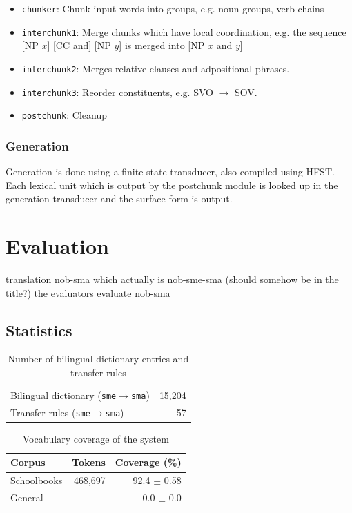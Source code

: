 \documentclass[a4paper,11pt,twocolumn]{article}
\begin{document}
\begin{itemize} 
  \item \texttt{chunker}: Chunk input words into groups, e.g. noun groups, verb chains
  \item \texttt{interchunk1}: Merge chunks which have local coordination, e.g. the sequence [NP $x$] [CC and] [NP $y$] is merged into [NP $x$ and $y$]
  \item \texttt{interchunk2}: Merges relative clauses and adpositional phrases.
  \item \texttt{interchunk3}: Reorder constituents, e.g. SVO $\rightarrow$ SOV.
  \item \texttt{postchunk}: Cleanup
\end{itemize}

\subsubsection{Generation}

Generation is done using a finite-state transducer, also 
compiled using HFST. Each lexical unit which is output by
the postchunk module is looked up in the generation transducer
and the surface form is output.

\section{Evaluation}
 translation nob-sma which actually is nob-sme-sma (should somehow be in the title?) 
 the evaluators evaluate nob-sma

\subsection{Statistics}
\begin{table}
  \begin{center}
    \begin{tabular}{|l|r|}
      \hline
      Bilingual dictionary ({\tt sme}$\rightarrow${\tt sma}) & 15,204 \\ %
      Transfer rules ({\tt sme}$\rightarrow${\tt sma}) & 57 \\
      \hline
    \end{tabular}
    \label{table:transfer}
    \caption{Number of bilingual dictionary entries and transfer rules}
  \end{center}
\end{table}

\begin{table}
  \begin{center}
    \begin{tabular}{|l|r|r|}
      \hline
      \textbf{Corpus} & \textbf{Tokens} & \textbf{Coverage (\%)}  \\
      \hline
      Schoolbooks     & 468,697 & 92.4 $\pm$ 0.58 \\
      General         & & 0.0 $\pm$ 0.0 \\
      \hline
    \end{tabular}
    \label{table:coverage}
    \caption{Vocabulary coverage of the system}
  \end{center}
\end{table}
\end{document}
